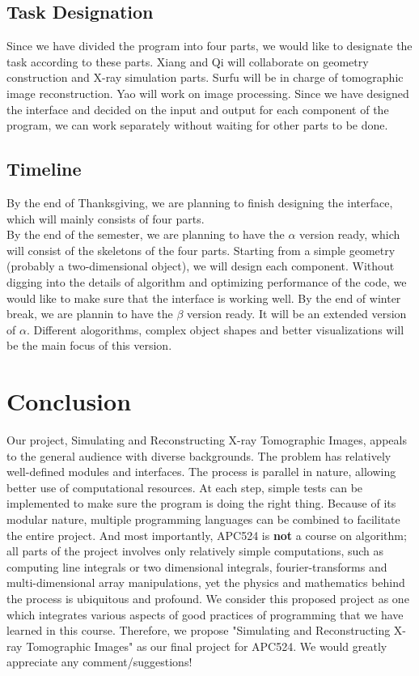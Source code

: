 \documentclass[11]{article}
\begin{document}
\subsection{Task Designation}
Since we have divided the program into four parts, we would like to designate the task according to these parts. Xiang and Qi will collaborate on geometry construction and X-ray simulation parts. Surfu will be in charge of tomographic image reconstruction. Yao will work on image processing. Since we have designed the interface and decided on the input and output for each component of the program, we can work separately without waiting for other parts to be done.

\subsection{Timeline}
By the end of Thanksgiving, we are planning to finish designing the interface, which will mainly consists of four parts.\\
By the end of the semester, we are planning to have the $\alpha$ version ready, which will consist of the skeletons of the four parts. Starting from a simple geometry (probably a two-dimensional object), we will design each component. Without digging into the details of algorithm and optimizing performance of the code, we would like to make sure that the interface is working well. 
By the end of winter break, we are plannin to have the $\beta$ version ready. It will be an extended version of $\alpha$. Different alogorithms, complex object shapes and better visualizations will be the main focus of this version.

	
\section{Conclusion}
Our project, Simulating and Reconstructing X-ray Tomographic Images, appeals to the general audience with diverse backgrounds. The problem has relatively well-defined modules and interfaces. The process is parallel in nature, allowing better use of computational resources. At each step, simple tests can be implemented to make sure the program is doing the right thing. Because of its modular nature, multiple programming languages can be combined to facilitate the entire project. And most importantly, APC524 is \textbf{not} a course on algorithm; all parts of the project involves only relatively simple computations, such as computing line integrals or two dimensional integrals, fourier-transforms and multi-dimensional array manipulations, yet the physics and mathematics behind the process is ubiquitous and profound. We consider this proposed project as one which integrates various aspects of good practices of programming that we have learned in this course. Therefore, we propose "Simulating and Reconstructing X-ray Tomographic Images" as our final project for APC524. We would greatly appreciate any comment/suggestions! 
\end{document}
